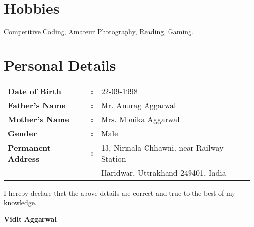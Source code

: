 \documentclass[a4paper, margin, centered]{res}
\begin{document}
\begin{resume}
\section{Hobbies}
Competitive Coding, Amateur Photography, Reading, Gaming.

\section{Personal Details}
\begin{table}[H]
\begin{tabular}{lll}
\textbf{Date of Birth} & \textbf{:} & 22-09-1998 \\
\textbf{Father's Name} & \textbf{:} & Mr. Anurag Aggarwal \\
\textbf{Mother's Name} & \textbf{:} & Mrs. Monika Aggarwal \\
\textbf{Gender} & \textbf{:} & Male \\
\textbf{Permanent Address} & \textbf{:} & 13, Nirmala Chhawni, near Railway Station,\\
\textbf{} & \textbf{} & Haridwar, Uttrakhand-249401, India
\end{tabular}
\end{table}

\hspace{-\hoffset}
I hereby declare that the above details are correct and true to the best of my knowledge.\hfill

\hspace{-\hoffset}
\textbf{Vidit Aggarwal}

\end{resume}
\end{document}
